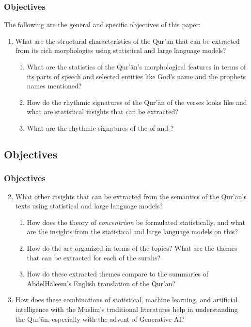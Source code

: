 \documentclass{beamer}
\theoremstyle{definition}
\begin{document}
\begin{frame}[t, fragile]\justifying
\frametitle{Objectives}
The following are the general and specific objectives of this paper:
\begin{enumerate}
\item What are the structural characteristics of the Qur'an that can be extracted from its rich morphologies using statistical and large language models?\pause
\begin{enumerate}
    \item What are the statistics of the Qur'\=an's morphological features in terms of its parts of speech and selected entities like God's name and the prophets names mentioned?\pause
    
    \item How do the rhythmic signatures of the Qur'\=an of the verses looks like and what are statistical insights that can be extracted?\pause

    \item What are the rhythmic signatures of the   of   and    ?
\end{enumerate}
\end{enumerate}
\end{frame}

\subsection{Objectives}
\begin{frame}[t, fragile]\justifying
\frametitle{Objectives}
\begin{enumerate}
\setcounter{enumi}{1}
\item What other insights that can be extracted from the semantics of the Qur'an's texts using statistical and large language models?\pause
\begin{enumerate}
    \item How does the theory of \textit{concentrism} be formulated statistically, and what are the insights from the statistical and large language models on this? \pause
    
    \item How do the   are organized in terms of the topics? What are the themes that can be extracted for each of the surahs?\pause
    
    \item How do these extracted themes compare to the summaries of Abdel\linebreak Haleem's English translation of the Qur'an?
\end{enumerate}\pause

\item How does these combinations of statistical, machine learning, and artificial intelligence with the Muslim's traditional literatures help in understanding the Qur'\=an, especially with the advent of Generative AI?
\end{enumerate}
\end{frame}
\end{document}
